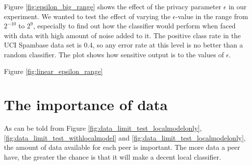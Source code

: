 Figure \ref{fig:epsilon_big_range} shows the effect of the privacy parameter $\epsilon$ in our experiment. We wanted to test the effect of varying the $\epsilon$-value in the range from $2^{-10}$ to $2^9$, especially to find out how the classifier would perform when faced with data with high amount of noise added to it. The positive class rate in the UCI Spambase data set is 0.4, so any error rate at this level is no better than a random classifier. The plot shows how sensitive output is to the values of $\epsilon$.

Figure \ref{fig:linear_epsilon_range} 

\section{The importance of data} \label{importance_of_data}
As can be told from Figure \ref{fig:data_limit_test_localmodelonly}, \ref{fig:data_limit_test_withlocalmodel} and \ref{fig:data_limit_test_localmodelonly}, the amount of data available for each peer is important. The more data a peer have, the greater the chance is that it will make a decent local classifier. 

